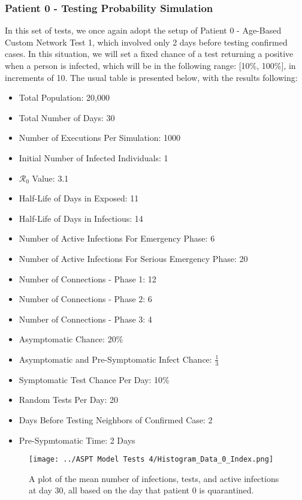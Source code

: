 \documentclass{article}
\numberwithin{equation}{section} %
\begin{document}
\subsubsection{Patient 0 - Testing Probability Simulation}
In this set of tests, we once again adopt the setup of Patient 0 - Age-Based Custom Network Test 1, which involved only 2 days before testing confirmed cases. In this situation, we will set a fixed chance of a test returning a positive when a person is infected, which will be in the following range: [10\%, 100\%], in increments of 10. The usual table is presented below, with the results following:\\
\begin{itemize}
\item Total Population: 20,000 
\item Total Number of Days: 30
\item Number of Executions Per Simulation: 1000
\item Initial Number of Infected Individuals: 1
\item $\mathcal{R}_0$ Value: 3.1
\item Half-Life of Days in Exposed: 11
\item Half-Life of Days in Infectious: 14
\item Number of Active Infections For Emergency Phase: 6
\item Number of Active Infections For Serious Emergency Phase: 20
\item Number of Connections - Phase 1: 12
\item Number of Connections - Phase 2: 6
\item Number of Connections - Phase 3: 4
\item Asymptomatic Chance: 20\%
\item Asymptomatic and Pre-Symptomatic Infect Chance: $\frac{1}{3}$
\item Symptomatic Test Chance Per Day: 10\%
\item Random Tests Per Day: 20
\item Days Before Testing Neighbors of Confirmed Case: 2
\item Pre-Sypmtomatic Time: 2 Days
\end{itemize}

\begin{figure}[H]
  \centering
  \texttt{[image: ../ASPT Model Tests 4/Histogram\_Data\_0\_Index.png]}
  \caption{A plot of the mean number of infections, tests, and active infections at day 30, all based on the day that patient 0 is quarantined.}
\end{figure}
\end{document}
